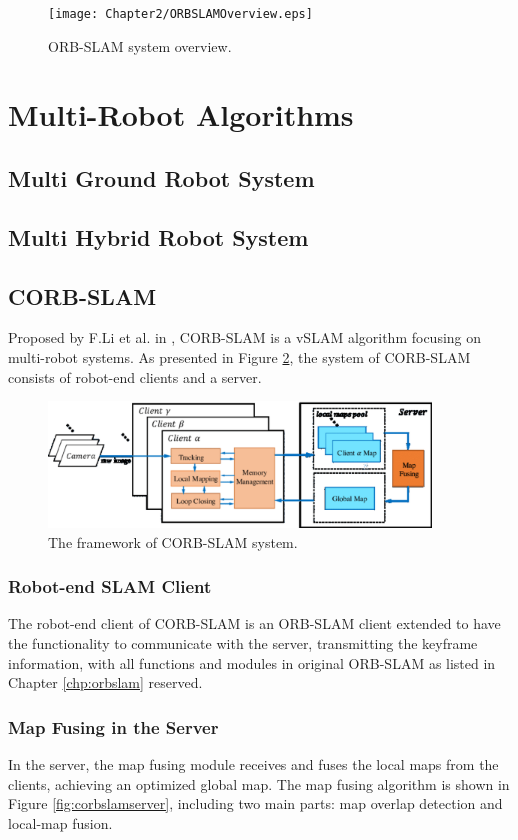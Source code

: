 \begin{figure}[H]
\centering
\texttt{[image: Chapter2/ORBSLAMOverview.eps]}
\caption{ORB-SLAM system overview.}
\label{fig:orbslamoverview} 
\end{figure}

\section{Multi-Robot Algorithms}
\subsection{Multi Ground Robot System}
\subsection{Multi Hybrid Robot System}
\subsection{CORB-SLAM}
Proposed by F.Li et al. in \cite{li2017corb}, CORB-SLAM is a vSLAM algorithm focusing on  multi-robot systems. As presented in Figure \ref{fig:corbslamoverview}, the system of CORB-SLAM consists of robot-end clients and a server.
\begin{figure}[H]
\centering
\includegraphics[width=4in]{Chapter2/CORBSLAMOverview.eps}
\caption{The framework of CORB-SLAM system.}
\label{fig:corbslamoverview} 
\end{figure}

\subsubsection{Robot-end SLAM Client}
The robot-end client of CORB-SLAM is an ORB-SLAM client extended to have the functionality to communicate with the server, transmitting the keyframe information, with all functions and modules in original ORB-SLAM as listed in Chapter \ref{chp:orbslam} reserved.

\subsubsection{Map Fusing in the Server}
In the server, the map fusing module receives and fuses the local maps from the clients, achieving an optimized global map. The map fusing algorithm is shown in Figure \ref{fig:corbslamserver}, including two main parts: map overlap detection and local-map fusion.

